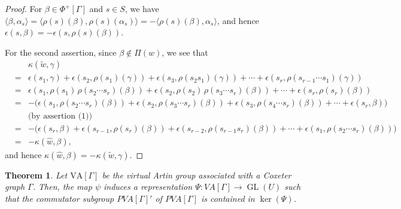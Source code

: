 \documentclass[12pt]{amsart}
\newtheorem{theorem}[equation]{Theorem}
\numberwithin{equation}{section}
\newcommand{\GL}{\operatorname{GL}}
\begin{document}
\begin{proof}
For  $\beta \in \Phi^{+}[\Gamma]$ and $s \in S$, we have $\langle \beta , \alpha_s \rangle = \langle \rho(s)(\beta) , \rho(s)(\alpha_s) \rangle= -\langle \rho(s)(\beta) , \alpha_s \rangle$, and hence $\epsilon(s,\beta)=-\epsilon (s, \rho(s)(\beta))$.
\par

For the second assertion, since $\beta \not\in \Pi(w)$, we see that
\begin{eqnarray*}
&& \kappa(\widetilde{w}, \gamma)\\
 &=& \epsilon(s_1,\gamma) + \epsilon(s_{2},\rho(s_1)(\gamma))+\epsilon(s_{3},\rho(s_{2}s_1)(\gamma))+\cdots+\epsilon(s_r,\rho(s_{r-1}\cdots s_1)(\gamma))\\
&=& \epsilon(s_1,\rho(s_1)\,\rho(s_{2}\cdots s_{r})(\beta)) + \epsilon(s_{2},\rho(s_2)\,\rho(s_3\cdots s_r)(\beta))+\cdots +\epsilon(s_r,\rho(s_{r})(\beta))\\
&=& - \Bigg(\epsilon(s_1,\rho(s_{2}\cdots s_{r})(\beta)) + \epsilon(s_{2},\rho(s_3\cdots s_r)(\beta))+\epsilon(s_{3},\rho(s_{4}\cdots s_r)(\beta))+\cdots+\epsilon(s_r,\beta) \Bigg)\\
&& \textrm{(by assertion (1))}\\
&=&-\Bigg(\epsilon(s_r,\beta) + \epsilon(s_{r-1},\rho(s_r)(\beta))+\epsilon(s_{r-2},\rho(s_{r-1}s_r)(\beta))+\cdots+\epsilon(s_1,\rho(s_2\cdots s_r)(\beta))\Bigg)\\
&=&-\kappa(\widehat{w}, \beta),
\end{eqnarray*}
and hence $\kappa(\widehat{w}, \beta)=-\kappa(\widetilde{w}, \gamma)$.
\end{proof}

\begin{theorem}\label{linear rep VAG}
Let $\text{VA}[\Gamma]$ be the virtual Artin group associated with a Coxeter graph $\Gamma$. Then, the map $\psi$ induces a representation $\Psi:VA[\Gamma]\to \GL(U)$ such that the commutator subgroup $PVA[\Gamma]'$ of $PVA[\Gamma]$ is contained in $\ker(\Psi)$.
\end{theorem}
\end{document}
